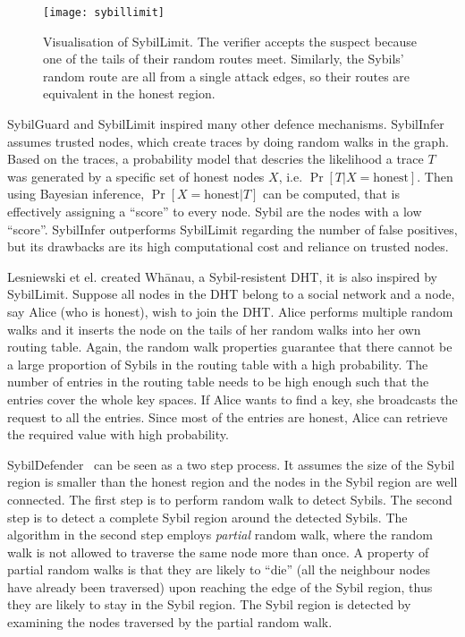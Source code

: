 \begin{figure}
  \centering
  \texttt{[image: sybillimit]}
  \caption{Visualisation of SybilLimit. The verifier accepts the suspect because
    one of the tails of their random routes meet. Similarly, the Sybils' random
    route are all from a single attack edges, so their routes are equivalent in
    the honest region.}
  \label{fig:sybillimit}
\end{figure}

SybilGuard and SybilLimit inspired many other defence mechanisms.
SybilInfer\cite{danezis2009sybilinfer} assumes trusted nodes, which create
traces by doing random walks in the graph. Based on the traces, a probability
model that descries the likelihood a trace $T$ was generated by a specific set
of honest nodes $X$, i.e. $\Pr[ T | X = \text{honest}]$. Then using Bayesian
inference, $\Pr[ X = \text{honest}| T ]$ can be computed, that is effectively
assigning a ``score'' to every node. Sybil are the nodes with a low ``score''.
SybilInfer outperforms SybilLimit regarding the number of false positives, but
its drawbacks are its high computational cost and reliance on trusted nodes.

Lesniewski et el. created Wh\={a}nau, a Sybil-resistent DHT, it is also inspired
by SybilLimit\cite{lesniewski2008sybil, lesniewski2010whanau}. Suppose all nodes
in the DHT belong to a social network and a node, say Alice (who is honest),
wish to join the DHT. Alice performs multiple random walks and it inserts the
node on the tails of her random walks into her own routing table. Again, the
random walk properties guarantee that there cannot be a large proportion of
Sybils in the routing table with a high probability. The number of entries in
the routing table needs to be high enough such that the entries cover the whole
key spaces. If Alice wants to find a key, she broadcasts the request to all the
entries. Since most of the entries are honest, Alice can retrieve the required
value with high probability.

SybilDefender~\cite{wei2012sybildefender} can be seen as a two step process. It
assumes the size of the Sybil region is smaller than the honest region and the
nodes in the Sybil region are well connected. The first step is to perform
random walk to detect Sybils. The second step is to detect a complete Sybil
region around the detected Sybils. The algorithm in the second step employs
\emph{partial} random walk, where the random walk is not allowed to traverse the
same node more than once. A property of partial random walks is that they
are likely to ``die'' (all the neighbour nodes have already been traversed) upon
reaching the edge of the Sybil region, thus they are likely to stay in the Sybil
region. The Sybil region is detected by examining the nodes traversed by the
partial random walk.

